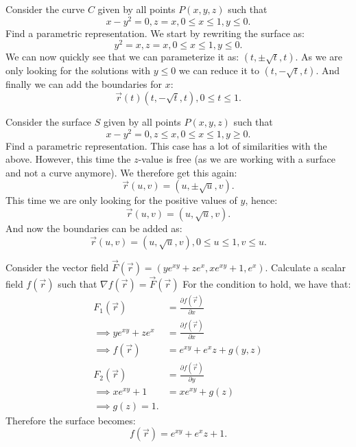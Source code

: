 \documentclass[a4paper]{article}
\begin{document}
Consider the curve $C$ given by all points $P(x,y,z)$ such that
\[ 
x - y^2 = 0, z = x, 0 \leq x \leq 1, y \leq 0
.\]
Find a parametric representation.
\bigbreak
We start by rewriting the surface as:
\[ 
y^2 = x, z = x, 0 \leq x \leq 1, y \leq 0
.\]
We can now quickly see that we can parameterize it as: $(t, \pm \sqrt{t}, t)$. As we are only looking for the solutions with $y \leq 0$ we can reduce it to $(t, - \sqrt{t}, t)$.
And finally we can add the boundaries for $x$:
\[ 
\Vec{r}(t) (t , - \sqrt{t}, t), 0 \leq t \leq 1
.\]



Consider the surface $S$ given by all points $P(x,y,z)$ such that
\[ 
x - y^2 = 0, z \leq x, 0 \leq x \leq 1, y \geq 0
.\]
Find a parametric representation.
\bigbreak
This case has a lot of similarities with the above. However, this time the $z$-value is free (as we are working with a surface and not a curve anymore). We therefore get this again:
\[ 
\Vec{r}(u, v) = (u , \pm \sqrt{u} , v)
.\]
This time we are only looking for the positive values of $y$, hence:
\[ 
\Vec{r}(u,v) = (u, \sqrt{u}, v)
.\]
And now the boundaries can be added as:
\[ 
\Vec{r}(u,v) = ( u, \sqrt{u}, v),  0 \leq u \leq 1, v \leq u
.\]


Consider the vector field $\Vec{F} \left( \Vec{r} \right) = \left( ye^{xy}+ ze^{x}, x e^{xy} + 1, e^{x} \right)$. Calculate a scalar field $f \left( \Vec{r} \right)$ such that $\nabla f \left( \Vec{r} \right) = \Vec{F} \left( \Vec{r} \right)$
\bigbreak
For the condition to hold, we have that:
\begin{align*}
  F_1(\Vec{r}) &= \frac{\partial f (\Vec{r})}{\partial x} \\
  \implies y e^{xy} + z e^{x} &= \frac{\partial f (\Vec{r})}{\partial x} \\
  \implies f \left( \Vec{r} \right) &= e^{x y}+e^x z + g(y,z)\\
  F_2 \left( \Vec{r} \right) &= \frac{\partial f (\Vec{r})}{\partial y} \\
  \implies x e^{xy} + 1 &= x e^{x y} + g(z)\\
  \implies g(z) = 1
.\end{align*}
Therefore the surface becomes:
\[ 
f (\Vec{r}) = e^{xy} + e^{x}z + 1
.\]
\end{document}
